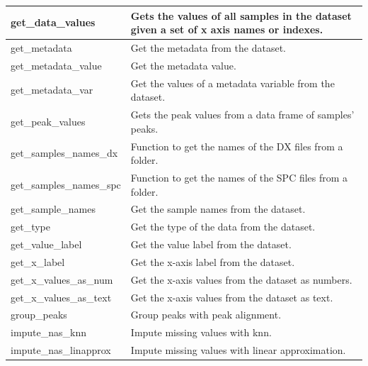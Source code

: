 \begin{scriptsize}
\begin{longtable}{|m{4.3cm}|m{11cm}|}
		\hline
		get\_data\_values & Gets the values of all samples in the dataset given a set of x axis names or indexes. \\
		
		\hline
		get\_metadata & Get the metadata from the dataset. \\
		
		\hline
		get\_metadata\_value & Get the metadata value. \\
		
		\hline
		get\_metadata\_var & Get the values of a metadata variable from the dataset. \\
		
		\hline
		get\_peak\_values & Gets the peak values from a data frame of samples’ peaks. \\
		
		\hline
		get\_samples\_names\_dx & Function to get the names of the DX files from a folder. \\
		
		\hline
		get\_samples\_names\_spc & Function to get the names of the SPC files from a folder. \\
		
		\hline
		get\_sample\_names & Get the sample names from the dataset. \\
		
		\hline
		get\_type & Get the type of the data from the dataset. \\
		
		\hline
		get\_value\_label & Get the value label from the dataset. \\
		
		\hline
		get\_x\_label & Get the x-axis label from the dataset. \\
		
		\hline
		get\_x\_values\_as\_num & Get the x-axis values from the dataset as numbers. \\
		
		\hline
		get\_x\_values\_as\_text & Get the x-axis values from the dataset as text. \\
		
		\hline
		group\_peaks & Group peaks with peak alignment. \\
		
		\hline
		impute\_nas\_knn & Impute missing values with \gls{knn}. \\
		
		\hline
		impute\_nas\_linapprox & Impute missing values with linear approximation. \\
		

\end{longtable}
\end{scriptsize}
